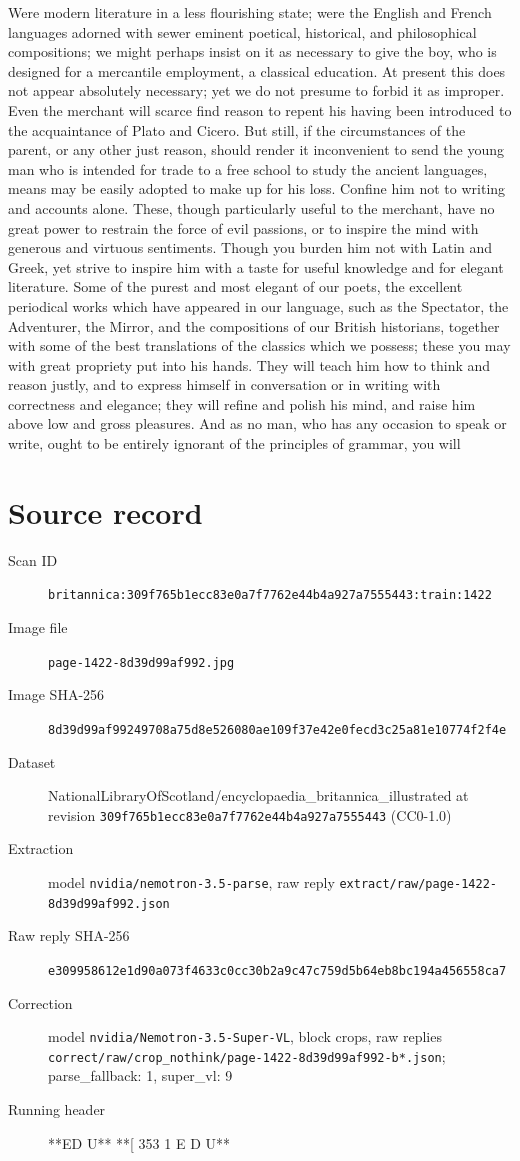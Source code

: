 \documentclass{article}
\begin{document}
Were modern literature in a less flourishing state; were the English and French languages adorned with sewer eminent poetical, historical, and philosophical compositions; we might perhaps insist on it as necessary to give the boy, who is designed for a mercantile employment, a classical education. At present this does not appear absolutely necessary; yet we do not presume to forbid it as improper. Even the merchant will scarce find reason to repent his having been introduced to the acquaintance of Plato and Cicero. But still, if the circumstances of the parent, or any other just reason, should render it inconvenient to send the young man who is intended for trade to a free school to study the ancient languages, means may be easily adopted to make up for his loss. Confine him not to writing and accounts alone. These, though particularly useful to the merchant, have no great power to restrain the force of evil passions, or to inspire the mind with generous and virtuous sentiments. Though you burden him not with Latin and Greek, yet strive to inspire him with a taste for useful knowledge and for elegant literature. Some of the purest and most elegant of our poets, the excellent periodical works which have appeared in our language, such as the Spectator, the Adventurer, the Mirror, and the compositions of our British historians, together with some of the best translations of the classics which we possess; these you may with great propriety put into his hands. They will teach him how to think and reason justly, and to express himself in conversation or in writing with correctness and elegance; they will refine and polish his mind, and raise him above low and gross pleasures. And as no man, who has any occasion to speak or write, ought to be entirely ignorant of the principles of grammar, you will


\section*{Source record}
\begin{description}
\item[Scan ID] \texttt{britannica:309f765b1ecc83e0a7f7762e44b4a927a7555443:train:1422}
\item[Image file] \texttt{page-1422-8d39d99af992.jpg}
\item[Image SHA-256] \texttt{8d39d99af99249708a75d8e526080ae109f37e42e0fecd3c25a81e10774f2f4e}
\item[Dataset] NationalLibraryOfScotland/encyclopaedia\_britannica\_illustrated at revision \texttt{309f765b1ecc83e0a7f7762e44b4a927a7555443} (CC0-1.0)
\item[Extraction] model \texttt{nvidia/nemotron-3.5-parse}, raw reply \texttt{extract/raw/page-1422-8d39d99af992.json}
\item[Raw reply SHA-256] \texttt{e309958612e1d90a073f4633c0cc30b2a9c47c759d5b64eb8bc194a456558ca7}
\item[Correction] model \texttt{nvidia/Nemotron-3.5-Super-VL}, block crops, raw replies \texttt{correct/raw/crop\_nothink/page-1422-8d39d99af992-b*.json}; parse\_fallback: 1, super\_vl: 9
\item[Running header] **ED U** **[ 353 1 E D U**
\end{description}
\end{document}
